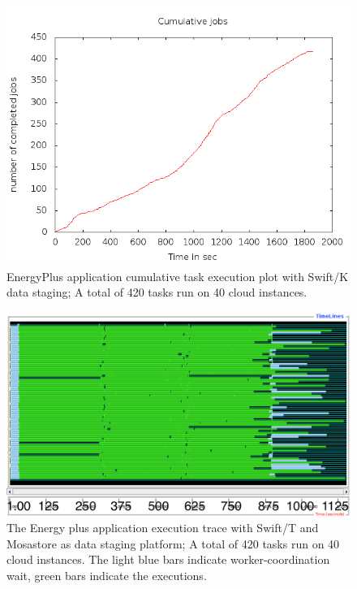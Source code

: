 \documentclass{sig-alternate}
\begin{document}
\begin{figure}[htb]
\begin{center}
\includegraphics[width=\linewidth]{plots/eplus_40i_80c.png}
\caption{EnergyPlus application cumulative task execution plot with
Swift/K data staging; A total of 420 tasks run on 40 cloud instances. 
\label{fig_eplus_k}
}
\end{center}
\end{figure}

\begin{figure}[htb]
\begin{center}
\includegraphics[width=\linewidth]{plots/eplus_timeline_40i_80c.png}
\caption{The Energy plus application execution trace with Swift/T and Mosastore
as data staging platform; A total of 420 tasks run on 40 cloud instances.
The light blue bars indicate worker-coordination wait, green bars
indicate the executions.
\label{fig_eplus_t}
}
\end{center}
\end{figure}
\end{document}
